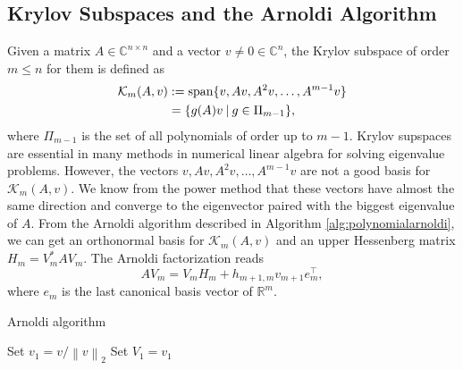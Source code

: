 \subsection{Krylov Subspaces and the Arnoldi Algorithm}\label{sec:arnoldi}
Given a matrix $A \in \mathbb{C}^{n \times n}$ and a vector $v \neq 0 \in \mathbb{C}^n$,
the Krylov subspace of order $m \leq n$ for them is defined \cite{golub2013matrix} as
\begin{equation}
    \label{eq:krylovsubspacedefinition}
    \begin{aligned}
        \mathcal{K}_m(A, v) & := \operatorname{span}\{v, Av, A^{2}v, \dots, A^{m-1}v \}\\
         & = \{g(A)v \:|\: g \in \Pi_{m-1} \},
    \end{aligned}
\end{equation}
where $\Pi_{m-1}$ is the set of all polynomials of order up to $m-1$.
Krylov supspaces are essential in many methods in numerical linear algebra
for solving eigenvalue problems. However, the vectors $v, Av, A^{2}v, \dots, A^{m-1}v$
are not a good basis for $\mathcal{K}_m(A, v)$. We know from the power method that
these vectors have almost the same direction and converge to the eigenvector paired
with the biggest eigenvalue of $A$.
From the Arnoldi algorithm \cite{trefethen1997numerical} described in Algorithm
\ref{alg:polynomialarnoldi}, we can get an orthonormal basis for $\mathcal{K}_m(A, v)$
and an upper Hessenberg matrix $H_m = V_m^* A V_m$. The Arnoldi factorization reads
\begin{equation}
    \label{eq:arnoldifactorization}
    A V_m = V_m H_m + h_{m+1, m} v_{m+1} e_m^\top,
\end{equation}
where $e_m$ is the last canonical basis vector of $\mathbb{R}^{m}$.

\begin{algorithm}
    \caption{Arnoldi algorithm}
    \label{alg:polynomialarnoldi}
    Set $v_1 = v / \left\| v \right\|_2$\;
    Set $V_1 = v_1$\;
        \end{algorithm}

